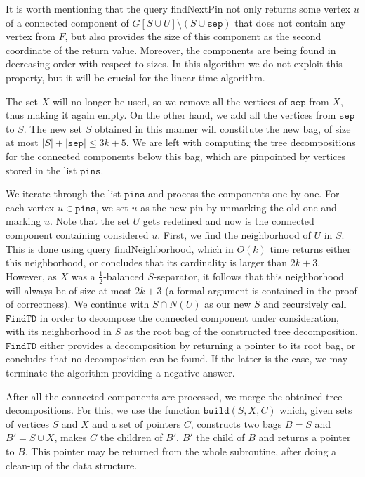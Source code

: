 \documentclass[a4paper,11pt]{article}
\theoremstyle{definition}
\theoremstyle{remark}
\newcommand{\findTD}{\mathtt{FindTD}}
\newcommand{\build}{\mathtt{build}}
\newcommand{\sep}{\mathtt{sep}}
\newcommand{\pins}{\mathtt{pins}}
\newcommand{\qnei}{\textnormal{findNeighborhood}}
\newcommand{\qpin}{\textnormal{findNextPin}}
\begin{document}
It is worth mentioning that the query \qpin{} not only returns some
vertex $u$ of a connected component of $G[S\cup U]\setminus (S\cup
\sep)$ that does not contain any vertex from $F$, but also provides
the size of this component as the second coordinate of the return
value.  Moreover, the components are being found in decreasing order
with respect to sizes.  In this algorithm we do not exploit this
property, but it will be crucial for the linear-time algorithm.

The set $X$ will no longer be used, so we remove all the vertices of
$\sep$ from $X$, thus making it again empty.  On the other hand, we
add all the vertices from $\sep$ to $S$.  The new set $S$ obtained in
this manner will constitute the new bag, of size at most
$|S|+|\sep|\leq 3k+5$.  We are left with computing the tree
decompositions for the connected components below this bag, which are
pinpointed by vertices stored in the list $\pins$.

We iterate through the list $\pins$ and process the components one by
one.  For each vertex $u\in \pins$, we set $u$ as the new pin by
unmarking the old one and marking $u$.  Note that the set $U$ gets
redefined and now is the connected component containing considered
$u$.  First, we find the neighborhood of $U$ in $S$.  This is done
using query \qnei, which in $O(k)$ time returns either this
neighborhood, or concludes that its cardinality is larger than $2k+3$.
However, as $X$ was a $\frac{1}{2}$-balanced $S$-separator, it follows
that this neighborhood will always be of size at most $2k+3$ (a formal
argument is contained in the proof of correctness).  We continue with
$S \cap N(U)$ as our new $S$ and recursively call $\findTD$ in order
to decompose the connected component under consideration, with its
neighborhood in $S$ as the root bag of the constructed tree
decomposition.  $\findTD$ either provides a decomposition by returning
a pointer to its root bag, or concludes that no decomposition can be
found.  If the latter is the case, we may terminate the algorithm
providing a negative answer.

After all the connected components are processed, we merge the
obtained tree decompositions.  For this, we use the function
$\build(S,X,C)$ which, given sets of vertices $S$ and $X$ and a set of
pointers $C$, constructs two bags $B = S$ and $B' = S \cup X$, makes
$C$ the children of $B'$, $B'$ the child of $B$ and returns a pointer
to $B$.  This pointer may be returned from the whole subroutine, after
doing a clean-up of the data structure.
\end{document}
